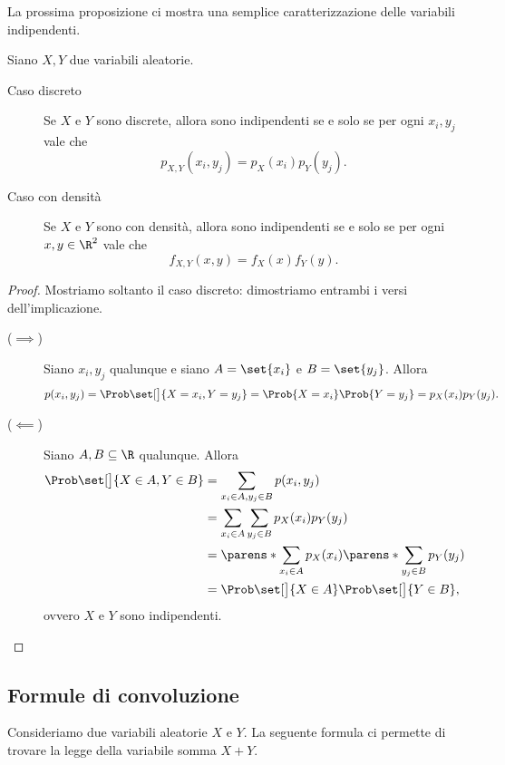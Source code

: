La prossima proposizione ci mostra una semplice caratterizzazione delle variabili indipendenti.
\begin{proposition}
    Siano $X, Y$ due variabili aleatorie. \begin{description}
        \item[Caso discreto] Se $X$ e $Y$ sono discrete, allora sono indipendenti se e solo se per ogni $x_i, y_j$ vale che \[
            p_{X, Y}(x_i, y_j) = p_X(x_i)p_Y(y_j).
        \]
        \item[Caso con densità] Se $X$ e $Y$ sono con densità, allora sono indipendenti se e solo se per ogni $x, y \in \R^2$ vale che \[
            f_{X, Y}(x, y) = f_X(x)f_Y(y).
        \]
    \end{description}
\end{proposition}
\begin{proof}
    Mostriamo soltanto il caso discreto: dimostriamo entrambi i versi dell'implicazione.
    \begin{description}
        \item[($\implies$)] Siano $x_i, y_j$ qualunque e siano $A = \set{x_i}$ e $B = \set{y_j}$. Allora \begin{align*}
            p(x_i, y_j) = \Prob\set[\big]{X = x_i, Y = y_j} = \Prob{X = x_i}\Prob{Y = y_j} = p_X(x_i)p_Y(y_j).
        \end{align*}
        \item[($\impliedby$)] Siano $A, B \subseteq \R$ qualunque. Allora \begin{align*}
            \Prob\set[\big]{X \in A, Y \in B} &= \sum_{x_i \in A, y_j \in B} p(x_i, y_j)\\
            &= \sum_{x_i \in A}\sum_{y_j \in B} p_X(x_i)p_Y(y_j)\\
            &= \parens*{\sum_{x_i \in A} p_X(x_i)} \parens*{\sum_{y_j \in B} p_Y(y_j)}\\
            &= \Prob\set[\big]{X \in A}\Prob\set[\big]{Y \in B},
        \end{align*} ovvero $X$ e $Y$ sono indipendenti. \qedhere
    \end{description}
\end{proof}

\subsection{Formule di convoluzione}

Consideriamo due variabili aleatorie $X$ e $Y$. La seguente formula ci permette di trovare la legge della variabile somma $X + Y$.


